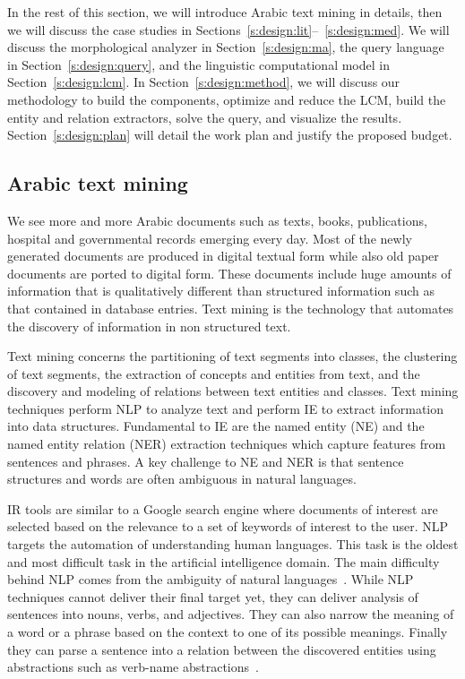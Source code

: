 \documentclass[12pt]{article}
\begin{document}
In the rest of this section, we will introduce Arabic text mining in 
details, then we will discuss the case studies in 
Sections~\ref{s:design:lit}--~\ref{s:design:med}. 
We will discuss the morphological analyzer in Section~\ref{s:design:ma}, 
the query language in Section~\ref{s:design:query}, and the linguistic
computational model in Section~\ref{s:design:lcm}.
In Section~\ref{s:design:method}, we will discuss our methodology
to build the components, optimize and reduce the LCM, build the
entity and relation extractors, solve the query, and visualize the 
results. 
Section~\ref{s:design:plan} will detail the work plan and
justify the proposed budget.

\subsection{Arabic text mining}
\label{s:design:atm}

We see more and more Arabic documents such as texts,
books, publications, hospital and governmental records emerging 
every day.
Most of the newly generated documents are produced in digital 
textual form while also old paper documents are ported to digital 
form.
These documents include huge amounts of information that is 
qualitatively different than structured information such as that 
contained in database entries.
Text mining is the technology that automates the discovery of 
information in non structured text.

Text mining concerns the partitioning of text segments 
into classes,
the clustering of text segments,
the extraction of concepts and entities from text,
and the discovery and modeling of relations between text entities 
and classes.
Text mining techniques perform NLP to analyze text and perform 
IE to extract information into data structures.
Fundamental to IE are the named entity (NE) and the named entity 
relation (NER) extraction techniques which capture features from 
sentences and phrases.
A key challenge to NE and NER is that sentence structures and 
words are often ambiguous in natural languages.

IR tools are similar to a Google search 
engine where documents of interest are selected based on the 
relevance to a set of keywords of interest to the user.
NLP targets the automation of understanding human languages.
This task is the oldest and most difficult task in the artificial 
intelligence domain.
The main difficulty behind NLP comes from the ambiguity of 
natural languages~\cite{Osm08}.
While NLP techniques cannot deliver their final target yet, they 
can deliver analysis of sentences into nouns, verbs, 
and adjectives.
They can also narrow the meaning of a word or a phrase based on 
the context to one of its possible meanings.
Finally they can parse a sentence into a relation between the 
discovered entities using abstractions such as verb-name 
abstractions~\cite{Osm08}.
\end{document}
